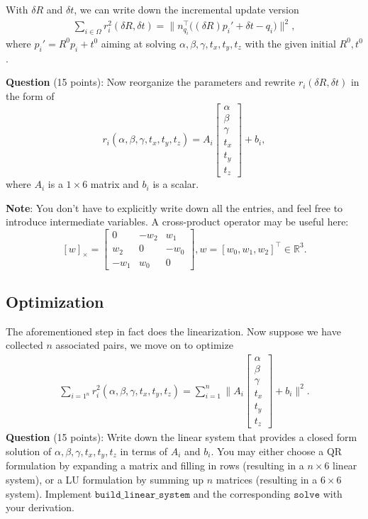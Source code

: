 \documentclass[12pt, a4paper]{article}
\begin{document}
With $\delta R$ and $\delta t$, we can write down the incremental update version
\begin{align}
    \sum_{i \in \Omega} r_i^2(\delta R, \delta t) = \bigg\lVert n_{q_i}^\top \bigg((\delta R) p_i' + \delta t - q_i \bigg)\bigg\rVert^2,
\end{align}
where $p_i' = R^0 p_i + t^0$ aiming at solving $\alpha, \beta, \gamma, t_x, t_y, t_z$ with the given initial $R^0, t^0$. 

\textbf{Question} (15 points): Now reorganize the parameters and rewrite $r_i(\delta R, \delta t)$ in the form of 
$$
r_i(\alpha, \beta, \gamma, t_x, t_y, t_z) = A_i \begin{bmatrix}
    \alpha \\ \beta \\ \gamma \\ t_x \\ t_y \\ t_z
\end{bmatrix} + b_i,
$$
where $A_i$ is a $1 \times 6$ matrix and $b_i$ is a scalar.

\textbf{Note}: You don't have to explicitly write down all the entries, and feel free to introduce intermediate variables. A cross-product operator may be useful here:
$$
[w]_\times = \begin{bmatrix}
    0 & -w_2 & w_1 \\
    w_2 & 0 & -w_0 \\
    -w_1 & w_0 & 0 
\end{bmatrix}, w = [w_0, w_1, w_2]^\top \in \mathbb{R}^3.
$$

\subsection{Optimization}
The aforementioned step in fact does the linearization. Now suppose we have collected $n$ associated pairs, we move on to optimize
\begin{align}
\sum_{i=1^n} r_i^2(\alpha, \beta, \gamma, t_x, t_y, t_z) = \sum_{i=1}^n \bigg\lVert A_i \begin{bmatrix}
    \alpha \\ \beta \\ \gamma \\ t_x \\ t_y \\ t_z
\end{bmatrix} + b_i\bigg\rVert^2.
\end{align}
\textbf{Question} (15 points): Write down the linear system that provides a closed form solution of $\alpha, \beta, \gamma, t_x, t_y, t_z$  in terms of $A_i$ and $b_i$. You may either choose a QR formulation by expanding a matrix and filling in rows (resulting in a $n \times 6$ linear system), or a LU formulation by summing up $n$ matrices (resulting in a $6 \times 6$ system). Implement $\mathtt{build\_linear\_system}$ and the corresponding $\mathtt{solve}$ with your derivation.
\end{document}
